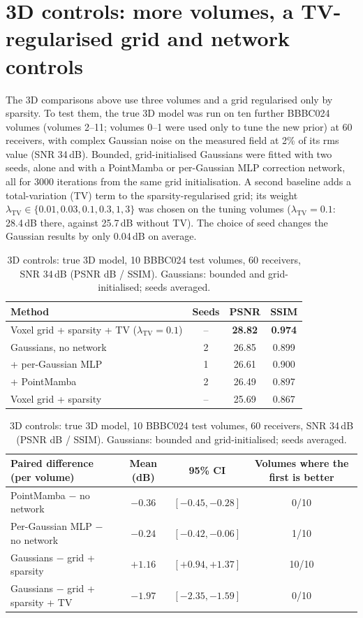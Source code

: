 \FloatBarrier
\section{3D controls: more volumes, a TV-regularised grid and network controls}
\label{sec:3dcontrols}
The 3D comparisons above use three volumes and a grid regularised only by sparsity. To test them, the true 3D model was
run on ten further BBBC024 volumes (volumes 2--11; volumes 0--1 were used only to tune the new prior) at 60 receivers,
with complex Gaussian noise on the measured field at 2\% of its rms value (SNR 34\,dB). Bounded, grid-initialised
Gaussians were fitted with two seeds, alone and with a PointMamba or per-Gaussian MLP correction network, all for 3000
iterations from the same grid initialisation. A second baseline adds a total-variation (TV) term to the sparsity-regularised
grid; its weight $\lambda_{\mathrm{TV}}\in\{0.01, 0.03, 0.1, 0.3, 1, 3\}$ was chosen on the tuning volumes
($\lambda_{\mathrm{TV}}=0.1$: 28.4\,dB there, against 25.7\,dB without TV). The choice of seed changes the Gaussian
results by only 0.04\,dB on average.

\begin{table}[htbp]
  \centering
  \caption{3D controls: true 3D model, 10 BBBC024 test volumes, 60 receivers, SNR 34\,dB (PSNR dB / SSIM).
  Gaussians: bounded and grid-initialised; seeds averaged.}
  \label{tab:3dcontrols}
  \begin{tabular}{lccc}
    \toprule
    Method & Seeds & PSNR & SSIM \\
    \midrule
    Voxel grid + sparsity + TV ($\lambda_{\mathrm{TV}}=0.1$) & -- & \textbf{28.82} & \textbf{0.974} \\
    Gaussians, no network & 2 & 26.85 & 0.899 \\
    \quad + per-Gaussian MLP & 1 & 26.61 & 0.900 \\
    \quad + PointMamba & 2 & 26.49 & 0.897 \\
    Voxel grid + sparsity & -- & 25.69 & 0.867 \\
    \bottomrule
  \end{tabular}

  \vspace{6pt}
  \begin{tabular}{lccc}
    \toprule
    Paired difference (per volume) & Mean (dB) & 95\% CI & Volumes where the first is better \\
    \midrule
    PointMamba $-$ no network & $-0.36$ & $[-0.45, -0.28]$ & 0/10 \\
    Per-Gaussian MLP $-$ no network & $-0.24$ & $[-0.42, -0.06]$ & 1/10 \\
    Gaussians $-$ grid + sparsity & $+1.16$ & $[+0.94, +1.37]$ & 10/10 \\
    Gaussians $-$ grid + sparsity + TV & $-1.97$ & $[-2.35, -1.59]$ & 0/10 \\
    \bottomrule
  \end{tabular}
\end{table}

